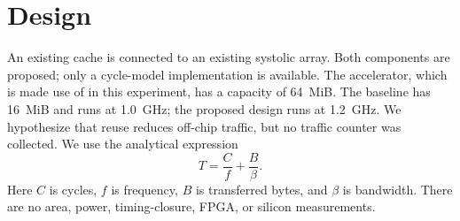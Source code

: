 \section{Design}\label{sec:design}
An existing cache is connected to an existing systolic array.
Both components are proposed; only a cycle-model implementation is available.
The accelerator, which is made use of in this experiment, has a capacity of 64~MiB.
The baseline has 16~MiB and runs at 1.0~GHz; the proposed design runs at 1.2~GHz.
We hypothesize that reuse reduces off-chip traffic, but no traffic counter was collected.
We use the analytical expression
\begin{equation}\label{eq:model}
T = \frac{C}{f} + \frac{B}{\beta}.
\end{equation}
Here $C$ is cycles, $f$ is frequency, $B$ is transferred bytes, and $\beta$ is bandwidth.
There are no area, power, timing-closure, FPGA, or silicon measurements.
